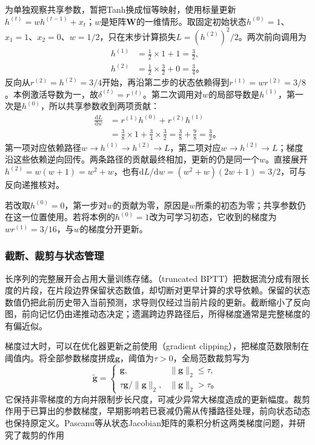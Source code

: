 \begin{example}[两步递推中的梯度累积]
  \label{ex:rnn-shared-gradient}
  为单独观察共享参数，暂把Tanh换成恒等映射，使用标量更新$h^{(t)}=w h^{(t-1)}+x_t$；$w$是矩阵$\bm W$的一维情形。取固定初始状态$h^{(0)}=1$、$x_1=1$、$x_2=0$、$w=1/2$，只在末步计算损失$L=(h^{(2)})^2/2$。两次前向调用为
  \[
    \begin{aligned}
      h^{(1)}&=\tfrac12\times1+1=\tfrac32,\\
      h^{(2)}&=\tfrac12\times\tfrac32+0=\tfrac34\text{。}
    \end{aligned}
  \]
  反向从$r^{(2)}=h^{(2)}=3/4$开始，再沿第二步的状态依赖得到$r^{(1)}=w r^{(2)}=3/8$。本例激活导数为一，故$\delta^{(t)}=r^{(t)}$。第二次调用对$w$的局部导数是$h^{(1)}$，第一次是$h^{(0)}$，所以共享参数收到两项贡献：
  \[
    \begin{aligned}
      \frac{\mathrm dL}{\mathrm dw}
        &=r^{(1)}h^{(0)}+r^{(2)}h^{(1)}\\
        &=\tfrac38\times1+\tfrac34\times\tfrac32
          =\tfrac38+\tfrac98=\tfrac32\text{。}
    \end{aligned}
  \]
  第一项对应依赖路径$w\to h^{(1)}\to h^{(2)}\to L$，第二项对应$w\to h^{(2)}\to L$；梯度沿这些依赖逆向回传。两条路径的贡献最终相加，更新的仍是同一个$w$。直接展开$h^{(2)}=w(w+1)=w^2+w$，也有$\mathrm dL/\mathrm dw=(w^2+w)(2w+1)=3/2$，可与反向递推核对。

  若改取$h^{(0)}=0$，第一步对$w$的贡献为零，原因是$w$所乘的初态为零；共享参数仍在这一位置使用。若将本例的$h^{(0)}=1$改为可学习初态，它收到的梯度为$w r^{(1)}=3/16$，与$w$的梯度分开更新。
\end{example}

\subsubsection{截断、裁剪与状态管理}
\label{sec:rnn-truncation}

长序列的完整展开会占用大量训练存储。（truncated BPTT）把数据流分成有限长度的片段，在片段边界保留状态数值，却切断对更早计算的求导依赖。保留的状态数值仍把此前历史带入当前预测，求导则仅经过当前片段的更新。截断缩小了反向图，前向记忆仍由递推动态决定；遗漏跨边界路径后，所得梯度通常是完整梯度的有偏近似。

梯度过大时，可以在优化器更新之前使用（gradient clipping），把梯度范数限制在阈值内。将全部参数梯度拼成$\bm{g}$，阈值为$\tau>0$，全局范数裁剪写为
\begin{equation}
  \widetilde{\bm{g}}=
  \begin{cases}
    \bm{g},&\lVert\bm{g}\rVert_2\leq\tau,\\
    \tau\bm{g}/\lVert\bm{g}\rVert_2,&\lVert\bm{g}\rVert_2>\tau\text{。}
  \end{cases}
  \label{eq:rnn-gradient-clipping}
\end{equation}
它保持非零梯度的方向并限制步长尺度，可减少异常大梯度造成的更新幅度。裁剪作用于已算出的参数梯度，早期影响若已衰减仍需从传播路径处理，前向状态动态也保持原定义。Pascanu等从状态Jacobian矩阵的乘积分析这两类梯度问题，并研究了裁剪的作用

